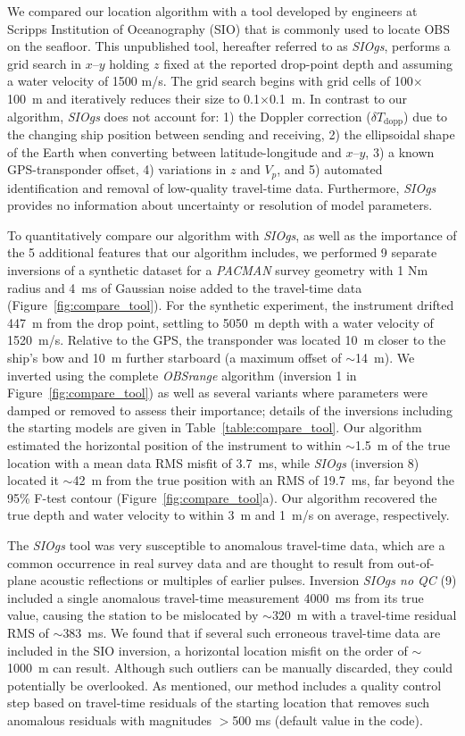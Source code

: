 We compared our location algorithm with a tool developed by engineers at Scripps Institution of Oceanography (SIO) that is commonly used to locate OBS on the seafloor. This unpublished tool, hereafter referred to as \textit{SIOgs}, performs a grid search in $x$--$y$ holding $z$ fixed at the reported drop-point depth and assuming a water velocity of 1500 m/s. The grid search begins with grid cells of 100$\times$100~m and iteratively reduces their size to 0.1$\times$0.1~m. In contrast to our algorithm, \textit{SIOgs} does not account for: 1) the Doppler correction ($\delta T_{\text{dopp}}$) due to the changing ship position between sending and receiving, 2) the ellipsoidal shape of the Earth when converting between latitude-longitude and $x$--$y$, 3) a known GPS-transponder offset, 4) variations in $z$ and $V_p$, and 5) automated identification and removal of low-quality travel-time data. Furthermore, \textit{SIOgs} provides no information about uncertainty or resolution of model parameters.  

To quantitatively compare our algorithm with \textit{SIOgs}, as well as the importance of the 5 additional features that our algorithm includes, we performed 9 separate inversions of a synthetic dataset for a \textit{PACMAN} survey geometry with 1 Nm radius and 4~ms of Gaussian noise added to the travel-time data (Figure~\ref{fig:compare_tool}). For the synthetic experiment, the instrument drifted 447~m from the drop point, settling to 5050~m depth with a water velocity of 1520~m/s. Relative to the GPS, the transponder was located 10~m closer to the ship's bow and 10~m further starboard (a maximum offset of $\sim$14~m). We inverted using the complete \textit{OBSrange} algorithm (inversion 1 in Figure~\ref{fig:compare_tool}) as well as several variants where parameters were damped or removed to assess their importance; details of the inversions including the starting models are given in Table~\ref{table:compare_tool}. Our algorithm estimated the horizontal position of the instrument to within $\sim$1.5~m of the true location with a mean data RMS misfit of 3.7~ms, while \textit{SIOgs} (inversion 8) located it $\sim$42~m from the true position with an RMS of 19.7~ms, far beyond the 95\% F-test contour (Figure~\ref{fig:compare_tool}a). Our algorithm recovered the true depth and water velocity to within 3~m and 1~m/s on average, respectively.

The \textit{SIOgs} tool was very susceptible to anomalous travel-time data, which are a common occurrence in real survey data and are thought to result from out-of-plane acoustic reflections or multiples of earlier pulses. Inversion \textit{SIOgs no QC} (9) included a single anomalous travel-time measurement 4000~ms from its true value, causing the station to be mislocated by $\sim$320~m with a travel-time residual RMS of $\sim$383~ms. We found that if several such erroneous travel-time data are included in the SIO inversion, a horizontal location misfit on the order of $\sim$1000~m can result. Although such outliers can be manually discarded, they could potentially be overlooked. As mentioned, our method includes a quality control step based on travel-time residuals of the starting location that removes such anomalous residuals with magnitudes $>$500 ms (default value in the code).


